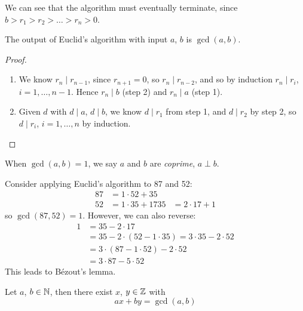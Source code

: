 \documentclass{../template/note}
\begin{document}
    We can see that the algorithm must eventually terminate, since \(b > r_1 > r_2 > \dots > r_n > 0\).
    
    \begin{theorem}
        The output of Euclid's algorithm with input \(a\), \(b\) is \(\gcd(a, b)\).
    \end{theorem}
    
    \begin{proof}
        \begin{enumerate}
            \item We know \(r_n \mid r_{n-1}\), since \(r_{n+1} = 0\), so \(r_n \mid r_{n-2}\), and so by induction \(r_n \mid r_i\), \(i = 1, \dots, n-1\). Hence \(r_n \mid b\) (step 2) and \(r_n \mid a\) (step 1).
            \item Given \(d\) with \(d \mid a\), \(d \mid b\), we know \(d \mid r_1\) from step 1, and \(d \mid r_2\) by step 2, so \(d \mid r_i\), \(i = 1, \dots, n\) by induction.
        \end{enumerate}
    \end{proof}

    
    \begin{definition}
        When \(\gcd(a, b)=1\), we say \(a\) and \(b\) are \emph{coprime}, \(a \perp b\).
    \end{definition}
    
    \begin{example}
        Consider applying Euclid's algorithm to 87 and 52:
        \begin{align*}
            87 &= 1 \cdot 52 + 35 \\
            52 &= 1 \cdot 35 + 17
            35 &= 2 \cdot 17 + 1
        \end{align*}
        so \(\gcd(87, 52) = 1\). However, we can also reverse:
        \begin{align*}
            1 &= 35 - 2 \cdot 17 \\
            &= 35 - 2 \cdot (52 - 1 \cdot 35) = 3 \cdot 35 - 2 \cdot 52 \\
            &= 3 \cdot (87 - 1 \cdot 52) - 2 \cdot 52 \\
            &= 3 \cdot 87 - 5 \cdot 52
        \end{align*}
        This leads to B\'ezout's lemma.                
    \end{example}
    
    \begin{theorem}
        \label{bezout} Let \(a\), \(b \in \mathbb N\), then there exist \(x\), \(y \in \mathbb Z\) with
        \[
            ax + by = \gcd(a, b)
        \]
    \end{theorem}
    
\end{document}
